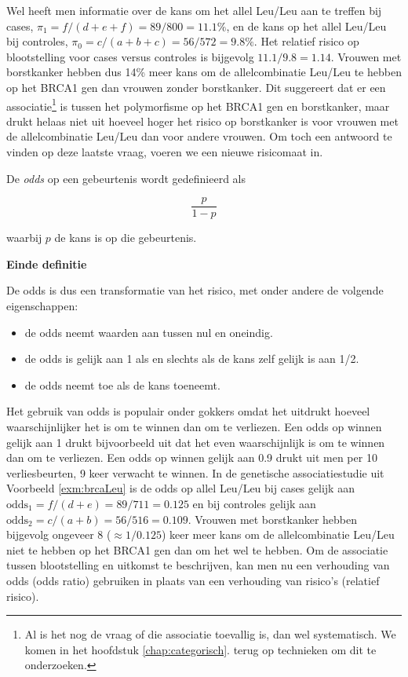 \documentclass[12pt,dutch,coursenotes]{book}
\let\rmarkdownfootnote\footnote%
\def\footnote{\protect\rmarkdownfootnote}
\theoremstyle{definition}
\theoremstyle{definition}
\theoremstyle{definition}
\theoremstyle{remark}
\let\BeginKnitrBlock\begin \let\EndKnitrBlock\end
\begin{document}
Wel heeft men informatie over de kans om het allel Leu/Leu aan te
treffen bij cases, \(\pi_1=f/(d+e+f)=89/800=11.1\%\), en de kans op het
allel Leu/Leu bij controles, \(\pi_0=c/(a+b+c)=56/572=9.8\%\). Het
relatief risico op blootstelling voor cases versus controles is
bijgevolg \(11.1/9.8=1.14\). Vrouwen met borstkanker hebben dus 14\%
meer kans om de allelcombinatie Leu/Leu te hebben op het BRCA1 gen dan
vrouwen zonder borstkanker. Dit suggereert dat er een
associatie\footnote{Al is het nog de vraag of die associatie toevallig
  is, dan wel systematisch. We komen in het hoofdstuk
  \ref{chap:categorisch}. terug op technieken om dit te onderzoeken.} is
tussen het polymorfisme op het BRCA1 gen en borstkanker, maar drukt
helaas niet uit hoeveel hoger het risico op borstkanker is voor vrouwen
met de allelcombinatie Leu/Leu dan voor andere vrouwen. Om toch een
antwoord te vinden op deze laatste vraag, voeren we een nieuwe
risicomaat in.

\BeginKnitrBlock{definition}[Odds]
\protect\hypertarget{def:unnamed-chunk-58}{}{\label{def:unnamed-chunk-58}
\iffalse (Odds) \fi{} }De \emph{odds} op een gebeurtenis wordt
gedefinieerd als

\begin{equation*}
\frac{p}{1-p}
\end{equation*}

waarbij \(p\) de kans is op die gebeurtenis.

\textbf{Einde definitie}
\EndKnitrBlock{definition}

De odds is dus een transformatie van het risico, met onder andere de
volgende eigenschappen:

\begin{itemize}
\item
  de odds neemt waarden aan tussen nul en oneindig.
\item
  de odds is gelijk aan 1 als en slechts als de kans zelf gelijk is aan
  1/2.
\item
  de odds neemt toe als de kans toeneemt.
\end{itemize}

Het gebruik van odds is populair onder gokkers omdat het uitdrukt
hoeveel waarschijnlijker het is om te winnen dan om te verliezen. Een
odds op winnen gelijk aan 1 drukt bijvoorbeeld uit dat het even
waarschijnlijk is om te winnen dan om te verliezen. Een odds op winnen
gelijk aan 0.9 drukt uit men per 10 verliesbeurten, 9 keer verwacht te
winnen. In de genetische associatiestudie uit Voorbeeld
\ref{exm:brcaLeu} is de odds op allel Leu/Leu bij cases gelijk aan
\(\mbox{odds}_1=f/(d+e)=89/711=0.125\) en bij controles gelijk aan
\(\mbox{odds}_2=c/(a+b)=56/516=0.109\). Vrouwen met borstkanker hebben
bijgevolg ongeveer 8 (\(\approx 1/0.125\)) keer meer kans om de
allelcombinatie Leu/Leu niet te hebben op het BRCA1 gen dan om het wel
te hebben. Om de associatie tussen blootstelling en uitkomst te
beschrijven, kan men nu een verhouding van odds (odds ratio) gebruiken
in plaats van een verhouding van risico's (relatief risico).
\end{document}
